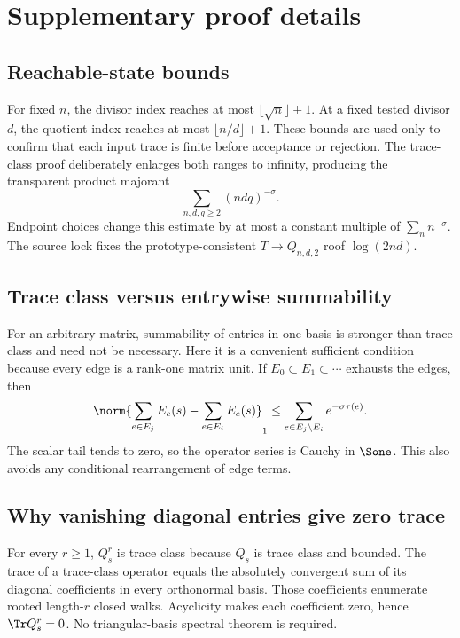 \section{Supplementary proof details}
\label{app:proofs}

\subsection{Reachable-state bounds}

For fixed $n$, the divisor index reaches at most
$\lfloor\sqrt n\rfloor+1$.  At a fixed tested divisor $d$, the quotient
index reaches at most $\lfloor n/d\rfloor+1$.  These bounds are used only to
confirm that each input trace is finite before acceptance or rejection.  The
trace-class proof deliberately enlarges both ranges to infinity, producing
the transparent product majorant
\[
\sum_{n,d,q\ge2}(ndq)^{-\sigma}.
\]
Endpoint choices change this estimate by at most a constant multiple of
$\sum_nn^{-\sigma}$.  The source lock fixes the prototype-consistent
$T\to Q_{n,d,2}$ roof $\log(2nd)$.

\subsection{Trace class versus entrywise summability}

For an arbitrary matrix, summability of entries in one basis is stronger
than trace class and need not be necessary.  Here it is a convenient
sufficient condition because every edge is a rank-one matrix unit.  If
$E_0\subset E_1\subset\cdots$ exhausts the edges, then
\[
\norm{\sum_{e\in E_j}E_e(s)-\sum_{e\in E_i}E_e(s)}_1
\le\sum_{e\in E_j\setminus E_i}e^{-\sigma\tau(e)}.
\]
The scalar tail tends to zero, so the operator series is Cauchy in
$\Sone$.  This also avoids any conditional rearrangement of edge terms.

\subsection{Why vanishing diagonal entries give zero trace}

For every $r\ge1$, $Q_s^r$ is trace class because $Q_s$ is trace class and
bounded.  The trace of a trace-class operator equals the absolutely
convergent sum of its diagonal coefficients in every orthonormal basis.
Those coefficients enumerate rooted length-$r$ closed walks.  Acyclicity
makes each coefficient zero, hence $\Tr Q_s^r=0$.  No triangular-basis
spectral theorem is required.

